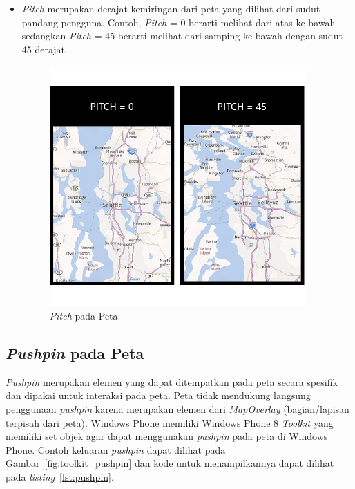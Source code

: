 \begin{itemize}
\begin{itemize}
			\item \textit{Pitch} merupakan derajat kemiringan dari peta yang dilihat dari sudut pandang pengguna. Contoh, \textit{Pitch} = 0 berarti melihat dari atas ke bawah sedangkan \textit{Pitch} = 45 berarti melihat dari samping ke bawah dengan sudut 45 derajat.
			\begin{figure}[h]
				\centering
					\includegraphics[scale=0.5]{Gambar/kontrol/pitch}
				\caption{\textit{Pitch} pada Peta\cite{MSDN}}
				\label{fig:pitch}
			\end{figure}
			\end{itemize} 
\end{itemize}

\subsection{\textit{Pushpin} pada Peta\cite{MSDN}}
\label{subsubsec:Pushpin ke Peta}
\hspace{0.5cm} \textit{Pushpin} merupakan elemen yang dapat ditempatkan pada peta secara spesifik dan dipakai untuk interaksi pada peta. Peta tidak mendukung langsung penggunaan \textit{pushpin} karena merupakan elemen dari \textit{MapOverlay} (bagian/lapisan terpisah dari peta). Windows Phone memiliki Windows Phone 8 \textit{Toolkit} yang memiliki set objek agar dapat menggunakan \textit{pushpin} pada peta di Windows Phone. Contoh keluaran \textit{pushpin} dapat dilihat pada Gambar~\ref{fig:toolkit_pushpin} dan kode untuk menampilkannya dapat dilihat pada \textit{listing}~\ref{lst:pushpin}.

